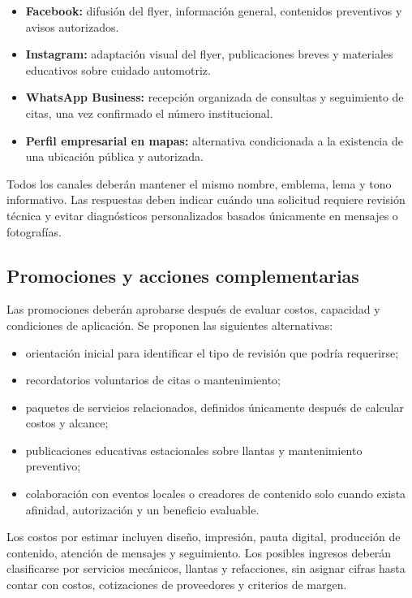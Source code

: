 \documentclass[12pt,letterpaper,oneside]{article}
\begin{document}
\begin{itemize}
    \item \textbf{Facebook:} difusión del flyer, información general, contenidos preventivos y avisos autorizados.
    \item \textbf{Instagram:} adaptación visual del flyer, publicaciones breves y materiales educativos sobre cuidado automotriz.
    \item \textbf{WhatsApp Business:} recepción organizada de consultas y seguimiento de citas, una vez confirmado el número institucional.
    \item \textbf{Perfil empresarial en mapas:} alternativa condicionada a la existencia de una ubicación pública y autorizada.
\end{itemize}

Todos los canales deberán mantener el mismo nombre, emblema, lema y tono informativo. Las respuestas deben indicar cuándo una solicitud requiere revisión técnica y evitar diagnósticos personalizados basados únicamente en mensajes o fotografías.

\subsection{Promociones y acciones complementarias}

Las promociones deberán aprobarse después de evaluar costos, capacidad y condiciones de aplicación. Se proponen las siguientes alternativas:

\begin{itemize}
    \item orientación inicial para identificar el tipo de revisión que podría requerirse;
    \item recordatorios voluntarios de citas o mantenimiento;
    \item paquetes de servicios relacionados, definidos únicamente después de calcular costos y alcance;
    \item publicaciones educativas estacionales sobre llantas y mantenimiento preventivo;
    \item colaboración con eventos locales o creadores de contenido solo cuando exista afinidad, autorización y un beneficio evaluable.
\end{itemize}

Los costos por estimar incluyen diseño, impresión, pauta digital, producción de contenido, atención de mensajes y seguimiento. Los posibles ingresos deberán clasificarse por servicios mecánicos, llantas y refacciones, sin asignar cifras hasta contar con costos, cotizaciones de proveedores y criterios de margen.
\end{document}
